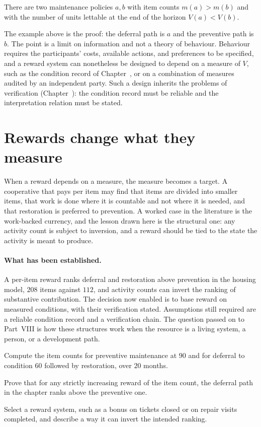 \begin{proposition}\label{prop:inversion}
There are two maintenance policies $a,b$ with item counts $m(a)>m(b)$ and with the number of units lettable at the end of the horizon $V(a)<V(b)$.
\end{proposition}

The example above is the proof: the deferral path is $a$ and the preventive path is $b$. The point is a limit on information and not a theory of behaviour. Behaviour requires the participants' costs, available actions, and preferences to be specified, and a reward system can nonetheless be designed to depend on a measure of $V$, such as the condition record of Chapter~, or on a combination of measures audited by an independent party. Such a design inherits the problems of verification (Chapter~): the condition record must be reliable and the interpretation relation must be stated.

\section{Rewards change what they measure}

When a reward depends on a measure, the measure becomes a target. A cooperative that pays per item may find that items are divided into smaller items, that work is done where it is countable and not where it is needed, and that restoration is preferred to prevention. A worked case in the literature is the work-backed currency, and the lesson drawn here is the structural one: any activity count is subject to inversion, and a reward should be tied to the state the activity is meant to produce.

\paragraph{What has been established.} A per-item reward ranks deferral and restoration above prevention in the housing model, $208$ items against $112$, and activity counts can invert the ranking of substantive contribution. The decision now enabled is to base reward on measured conditions, with their verification stated. Assumptions still required are a reliable condition record and a verification chain. The question passed on to Part~VIII is how these structures work when the resource is a living system, a person, or a development path.

\begin{exercise}
Compute the item counts for preventive maintenance at $90$ and for deferral to condition $60$ followed by restoration, over $20$ months.
\end{exercise}
\begin{exercise}
Prove that for any strictly increasing reward of the item count, the deferral path in the chapter ranks above the preventive one.
\end{exercise}
\begin{exercise}
Select a reward system, such as a bonus on tickets closed or on repair visits completed, and describe a way it can invert the intended ranking.
\end{exercise}
